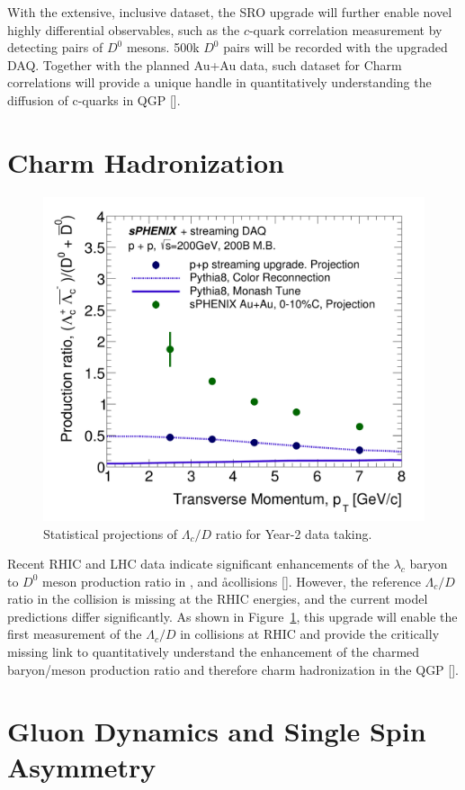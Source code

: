 With the extensive, inclusive dataset, the SRO upgrade will further enable novel highly differential observables, such as the $c$-quark correlation measurement by detecting pairs of $D^0$ mesons. 500k $D^0$ pairs will be recorded with the upgraded DAQ. Together with the planned Au+Au data, such dataset for Charm correlations will provide a unique handle in quantitatively understanding the diffusion of c-quarks in QGP []. 

\section{Charm Hadronization}


\begin{figure}[htbp]
\begin{center}
\includegraphics[width=.49\linewidth]{figs/RAA_DB_theory_root_LcD0Ratio_pp200B.pdf}
\caption{Statistical projections of $\Lambda_c/D$ ratio for Year-2 data taking.}
\label{fig:Lc-D0}
\end{center}
\end{figure}



Recent RHIC and LHC data indicate significant enhancements of the  $\lambda_c$ baryon to $D^0$ meson production ratio in \pp,  \pA and \aa  collisions []. However, the reference $\Lambda_c/D$ ratio in the \pp collision is missing at the RHIC energies, and the current model predictions differ significantly. As shown in Figure~\ref{fig:Lc-D0}, this upgrade will enable the first measurement of the $\Lambda_c/D$ in \pp collisions at RHIC and provide the critically missing link to quantitatively understand the enhancement of the charmed baryon/meson production ratio and therefore charm hadronization in the QGP []. 


\section{Gluon Dynamics and Single Spin Asymmetry}



